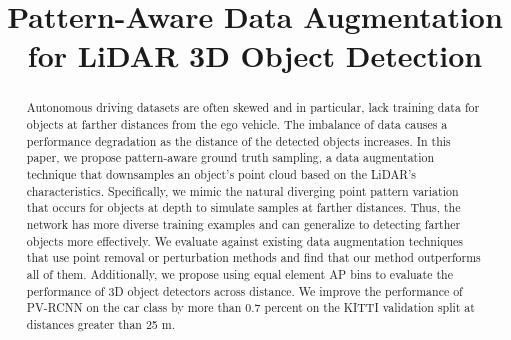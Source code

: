 \documentclass[10pt, conference, compsocconf]{IEEEtran}
\begin{document}
%
\title{Pattern-Aware Data Augmentation for LiDAR 3D Object Detection}



\author{
}



\maketitle

\begin{abstract}
Autonomous driving datasets are often skewed and in particular, lack training data for objects at farther distances from the ego vehicle. The imbalance of data causes a performance degradation as the distance of the detected objects increases. In this paper, we propose pattern-aware ground truth sampling, a  data augmentation technique that downsamples an object's point cloud based on the LiDAR's characteristics. Specifically, we mimic the natural diverging point pattern variation that occurs for objects at depth to simulate samples at farther distances. Thus, the network has more diverse training examples and can generalize to detecting farther objects more effectively. We evaluate against existing data augmentation techniques that use point removal or perturbation methods and find that our method outperforms all of them. Additionally, we propose using equal element AP bins to evaluate the performance of 3D object detectors across distance. We improve the performance of PV-RCNN on the car class by more than 0.7 percent on the KITTI validation split at distances greater than 25 m.
\end{abstract}
\end{document}
